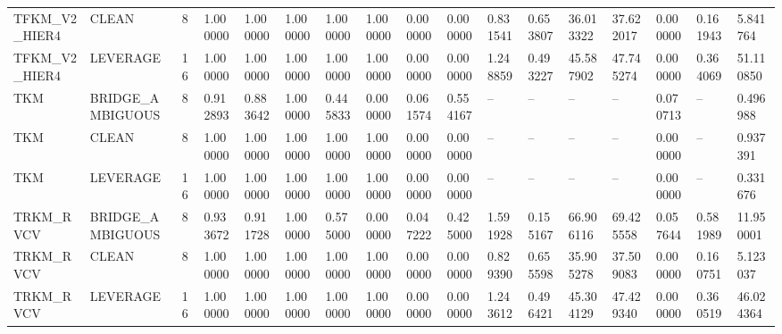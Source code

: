 \begin{tabular}{lllllllllllllllll}
TFKM\_V2\_HIER4 & CLEAN & 8 & 1.000000 & 1.000000 & 1.000000 & 1.000000 & 1.000000 & 0.000000 & 0.000000 & 0.831541 & 0.653807 & 36.013322 & 37.622017 & 0.000000 & 0.161943 & 5.841764 \\
TFKM\_V2\_HIER4 & LEVERAGE & 16 & 1.000000 & 1.000000 & 1.000000 & 1.000000 & 1.000000 & 0.000000 & 0.000000 & 1.248859 & 0.493227 & 45.587902 & 47.745274 & 0.000000 & 0.364069 & 51.110850 \\
TKM & BRIDGE\_AMBIGUOUS & 8 & 0.912893 & 0.883642 & 1.000000 & 0.445833 & 0.000000 & 0.061574 & 0.554167 & -- & -- & -- & -- & 0.070713 & -- & 0.496988 \\
TKM & CLEAN & 8 & 1.000000 & 1.000000 & 1.000000 & 1.000000 & 1.000000 & 0.000000 & 0.000000 & -- & -- & -- & -- & 0.000000 & -- & 0.937391 \\
TKM & LEVERAGE & 16 & 1.000000 & 1.000000 & 1.000000 & 1.000000 & 1.000000 & 0.000000 & 0.000000 & -- & -- & -- & -- & 0.000000 & -- & 0.331676 \\
TRKM\_RVCV & BRIDGE\_AMBIGUOUS & 8 & 0.933672 & 0.911728 & 1.000000 & 0.575000 & 0.000000 & 0.047222 & 0.425000 & 1.591928 & 0.155167 & 66.906116 & 69.425558 & 0.057644 & 0.581989 & 11.950001 \\
TRKM\_RVCV & CLEAN & 8 & 1.000000 & 1.000000 & 1.000000 & 1.000000 & 1.000000 & 0.000000 & 0.000000 & 0.829390 & 0.655598 & 35.905278 & 37.509083 & 0.000000 & 0.160751 & 5.123037 \\
TRKM\_RVCV & LEVERAGE & 16 & 1.000000 & 1.000000 & 1.000000 & 1.000000 & 1.000000 & 0.000000 & 0.000000 & 1.243612 & 0.496421 & 45.304129 & 47.429340 & 0.000000 & 0.360519 & 46.024364 \\
\bottomrule
\end{tabular}
